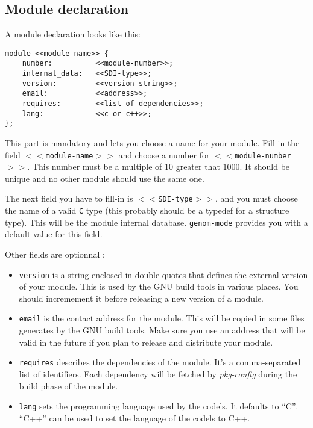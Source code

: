 \subsection{Module declaration}

A module declaration looks like this:

\begin{center}\begin{cartouche}\small\begin{verbatim}
module <<module-name>> {
    number:          <<module-number>>;
    internal_data:   <<SDI-type>>;
    version:         <<version-string>>;
    email:           <<address>>;
    requires:        <<list of dependencies>>;
    lang:            <<c or c++>>;
};
\end{verbatim}\end{cartouche}\end{center}

This part   is  mandatory  and    lets   you  choose a  name   for   your
module.  Fill-in the field  {\tt $<<$module-name$>>$} and choose a number
for {\tt  $<<$module-number$>>$}. This number must  be a multiple of $10$
greater that  $1000$. It should be unique  and no other module should use
the same one.

The next  field you have  to fill-in  is {\tt  $<<$SDI-type$>>$}, and you
must choose the name of  a valid {\tt C} type  (this probably should be a
typedef  for  a   structure type).   This  will  be  the  module internal
database. {\tt   genom-mode} provides you with  a  default value for this
field.

Other fields are optionnal :

\begin{itemize}

\item \texttt{version} is a string enclosed in
double-quotes that defines the external version of your module. This
is used by the GNU build tools in various places. You should
incremement it before releasing a new version of a module.

\item \texttt{email} is the contact address for the module. This will
      be copied in some files generates by the GNU build tools. Make
      sure you use an address that will be valid in the future if you
      plan to release and distribute your module.

\item \texttt{requires} describes the dependencies of the module. It's
      a comma-separated list of identifiers. Each dependency will be
      fetched by \emph{pkg-config} during the build phase of the
      module.

\item \texttt{lang} sets the programming language used by the
      codels. It defaults to ``C''. ``C++'' can be used to set the
      language of the codels to C++.
\end{itemize}

